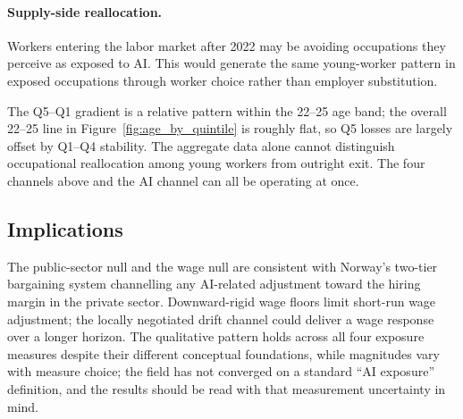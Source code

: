 \paragraph{Supply-side reallocation.} Workers entering the labor market after 2022 may be avoiding occupations they perceive as exposed to AI. This would generate the same young-worker pattern in exposed occupations through worker choice rather than employer substitution.

The Q5--Q1 gradient is a relative pattern within the 22--25 age band; the overall 22--25 line in Figure~\ref{fig:age_by_quintile} is roughly flat, so Q5 losses are largely offset by Q1--Q4 stability. The aggregate data alone cannot distinguish occupational reallocation among young workers from outright exit. The four channels above and the AI channel can all be operating at once.


\subsection{Implications}\label{sec:discussion:implications}

The public-sector null and the wage null are consistent with Norway's two-tier bargaining system \citep{bhuller2022} channelling any AI-related adjustment toward the hiring margin in the private sector. Downward-rigid wage floors limit short-run wage adjustment; the locally negotiated drift channel could deliver a wage response over a longer horizon. The qualitative pattern holds across all four exposure measures despite their different conceptual foundations, while magnitudes vary with measure choice; the field has not converged on a standard ``AI exposure'' definition, and the results should be read with that measurement uncertainty in mind.
